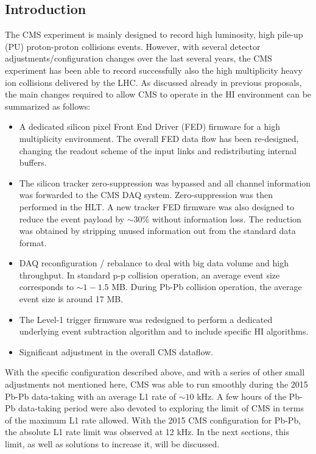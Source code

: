 \subsection{Introduction\label{subsec:HWintro}}
The CMS experiment is mainly designed to record high luminosity, high pile-up (PU) proton-proton collisions events.  However, with several detector adjustments/configuration changes over the last several years, the CMS experiment has been able to record successfully also the high multiplicity heavy ion collisions delivered by the LHC. As discussed already in previous
proposals, the main changes required to allow CMS to operate in the HI environment can be summarized as follows:

\begin{itemize}
\item A dedicated silicon pixel Front End Driver (FED) firmware for a high multiplicity environment. The overall FED data flow has been re-designed, changing the readout scheme of the input links and redistributing internal buffers.
 
\item The silicon tracker zero-suppression was bypassed and all channel information was forwarded to the CMS DAQ system. Zero-suppression was then performed in the HLT. A new tracker FED firmware was also designed to reduce the event payload by $\sim 30 \%$ without information loss. The reduction was obtained by stripping unused information out from the standard data format.  

\item DAQ reconfiguration / rebalance to deal with big data volume and high throughput. In standard p-p collision operation, an average event size corresponds to $\sim 1-1.5$ MB. During Pb-Pb collision operation, the average event size is around 17 MB. 

\item The Level-1 trigger firmware was redesigned to perform a dedicated underlying event subtraction algorithm and to include specific HI algorithms.

\item Significant adjustment in the overall CMS dataflow.
\end{itemize}


With the specific configuration described above, and with a series of other small adjustments not mentioned here, CMS was able to run smoothly during the 2015 Pb-Pb data-taking with an average L1 rate of $\sim 10$ kHz. A few hours of the Pb-Pb data-taking
period were also devoted to exploring the limit of CMS in terms of the maximum L1 rate allowed.  With the 2015 CMS configuration for Pb-Pb, the absolute L1 rate limit was observed at 12 kHz. In the next sections, this limit, as well as solutions to increase it, will be discussed. 

